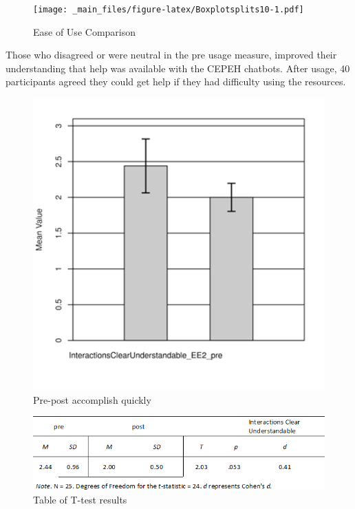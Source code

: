 \documentclass[a4paper, nobind]{templates/ociamthesis}
\begin{document}
\begin{figure}
\centering
\texttt{[image: \_main\_files/figure-latex/Boxplotsplits10-1.pdf]}
\caption{\label{fig:Boxplotsplits10}Ease of Use Comparison}
\end{figure}

Those who disagreed or were neutral in the pre usage measure, improved
their understanding that help was available with the CEPEH chatbots.
After usage, 40 participants agreed they could get help if they had
difficulty using the resources.

\begin{figure}

{\centering \includegraphics[width=5.33in]{clear} 

}

\caption{Pre-post accomplish quickly}\label{fig:accomplishquickly}
\end{figure}

\begin{figure}

{\centering \includegraphics[width=8.64in]{table ttest} 

}

\caption{Table of T-test results}\label{fig:ttest}
\end{figure}
\end{document}
